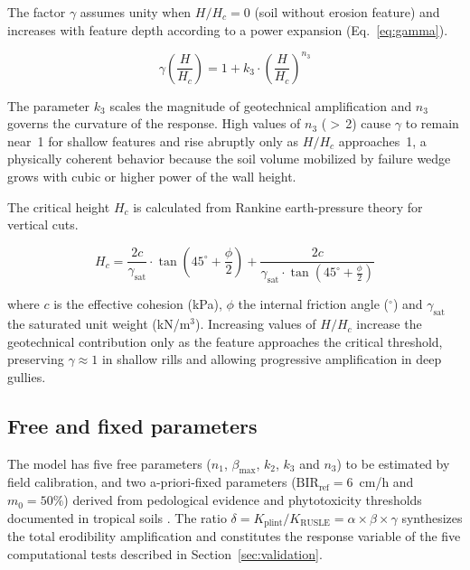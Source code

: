 \documentclass[preprint,review,12pt,authoryear]{elsarticle}
\begin{document}
The factor $\gamma$ assumes unity when $H/H_c = 0$ (soil without erosion feature) and increases with feature depth according to a power expansion (Eq.~\ref{eq:gamma}).

\begin{equation}
\gamma\!\left(\frac{H}{H_c}\right) = 1 + k_3 \cdot \left(\frac{H}{H_c}\right)^{n_3}
\label{eq:gamma}
\end{equation}

The parameter $k_3$ scales the magnitude of geotechnical amplification and $n_3$ governs the curvature of the response. High values of $n_3$ ($>$\,2) cause $\gamma$ to remain near~1 for shallow features and rise abruptly only as $H/H_c$ approaches~1, a physically coherent behavior because the soil volume mobilized by failure wedge grows with cubic or higher power of the wall height.

The critical height $H_c$ is calculated from Rankine earth-pressure theory for vertical cuts.

\begin{equation}
H_c = \frac{2c}{\gamma_{\mathrm{sat}}} \cdot \tan\!\left(45^\circ + \frac{\phi}{2}\right) + \frac{2c}{\gamma_{\mathrm{sat}} \cdot \tan\!\left(45^\circ + \frac{\phi}{2}\right)}
\label{eq:hc}
\end{equation}

\noindent where $c$ is the effective cohesion (kPa), $\phi$ the internal friction angle ($^\circ$) and $\gamma_{\mathrm{sat}}$ the saturated unit weight (kN/m$^3$). Increasing values of $H/H_c$ increase the geotechnical contribution only as the feature approaches the critical threshold, preserving $\gamma \approx 1$ in shallow rills and allowing progressive amplification in deep gullies.

\subsection{Free and fixed parameters}

The model has five free parameters ($n_1$, $\beta_{\max}$, $k_2$, $k_3$ and $n_3$) to be estimated by field calibration, and two a-priori-fixed parameters ($\mathrm{BIR_{ref}} = 6$~cm/h and $m_0 = 50\%$) derived from pedological evidence and phytotoxicity thresholds documented in tropical soils \citep{embrapa_2018}. The ratio $\delta = K_{\mathrm{plint}} / K_{\mathrm{RUSLE}} = \alpha \times \beta \times \gamma$ synthesizes the total erodibility amplification and constitutes the response variable of the five computational tests described in Section~\ref{sec:validation}.
\end{document}
